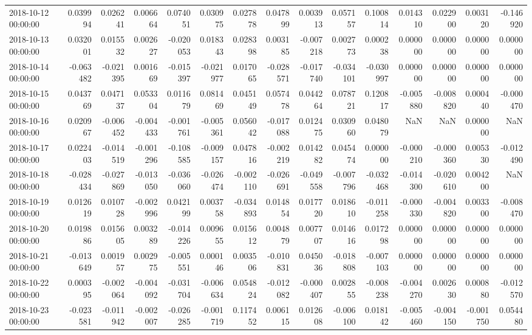 \begin{tabular}{lrrrrrrrrrrrrrr}
2018-10-12 00:00:00 & 0.039994 & 0.026241 & 0.006664 & 0.074051 & 0.030975 & 0.027878 & 0.047899 & 0.003913 & 0.057157 & 0.100814 & 0.014310 & 0.022900 & 0.003120 & -0.146920 \\
2018-10-13 00:00:00 & 0.032001 & 0.015532 & 0.002627 & -0.020053 & 0.018343 & 0.028398 & 0.003185 & -0.007218 & 0.002773 & 0.000238 & 0.000000 & 0.000000 & 0.000000 & 0.000000 \\
2018-10-14 00:00:00 & -0.063482 & -0.021395 & 0.001669 & -0.015397 & -0.021977 & 0.017065 & -0.028571 & -0.017740 & -0.034101 & -0.030997 & 0.000000 & 0.000000 & 0.000000 & 0.000000 \\
2018-10-15 00:00:00 & 0.043769 & 0.047137 & 0.053304 & 0.011679 & 0.081469 & 0.045149 & 0.057478 & 0.044264 & 0.078721 & 0.120817 & -0.005880 & -0.008820 & 0.000440 & -0.000470 \\
2018-10-16 00:00:00 & 0.020967 & -0.006452 & -0.004433 & -0.001761 & -0.005361 & 0.056042 & -0.017088 & 0.012475 & 0.030960 & 0.048079 & NaN & NaN & 0.000000 & NaN \\
2018-10-17 00:00:00 & 0.022403 & -0.014519 & -0.001296 & -0.108585 & -0.009157 & 0.047816 & -0.002219 & 0.014282 & 0.045474 & 0.000000 & -0.000210 & -0.000360 & 0.005330 & -0.012490 \\
2018-10-18 00:00:00 & -0.028434 & -0.027869 & -0.013050 & -0.036060 & -0.026474 & -0.002110 & -0.026691 & -0.049558 & -0.007796 & -0.032468 & -0.014300 & -0.020610 & 0.004200 & NaN \\
2018-10-19 00:00:00 & 0.012619 & 0.010728 & -0.002996 & 0.042199 & 0.003758 & -0.034893 & 0.014854 & 0.017720 & 0.018610 & -0.011258 & -0.000330 & -0.004820 & 0.003300 & -0.008470 \\
2018-10-20 00:00:00 & 0.019886 & 0.015605 & 0.003289 & -0.014226 & 0.009655 & 0.015612 & 0.004879 & 0.007707 & 0.014616 & 0.017298 & 0.000000 & 0.000000 & 0.000000 & 0.000000 \\
2018-10-21 00:00:00 & -0.013649 & 0.001957 & 0.002975 & -0.005551 & 0.000146 & 0.003506 & -0.010831 & 0.045036 & -0.018808 & -0.007103 & 0.000000 & 0.000000 & 0.000000 & 0.000000 \\
2018-10-22 00:00:00 & 0.000395 & -0.002064 & -0.004092 & -0.031704 & -0.006634 & 0.054824 & -0.012082 & -0.000407 & 0.002855 & -0.008238 & -0.004270 & 0.002630 & 0.000880 & -0.012570 \\
2018-10-23 00:00:00 & -0.023581 & -0.011942 & -0.002007 & -0.026285 & -0.001719 & 0.117452 & 0.006115 & 0.012608 & -0.006100 & 0.018142 & -0.005460 & -0.004150 & -0.001750 & 0.054480 \\

\end{tabular}
